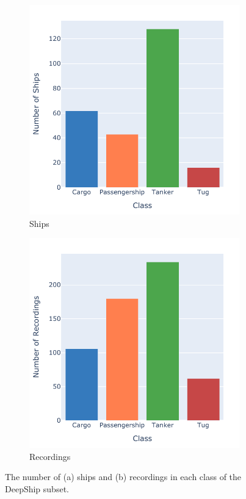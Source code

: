 \begin{figure}[p]
    \begin{subfigure}{0.49\textwidth}
        \centering
        \includegraphics[width=\textwidth]{img/ch3/deepship_figs/num_ships_per_class.pdf}
        \caption{Ships}
        \label{fig:deepship-subset-number-vessels}
    \end{subfigure}
    \hfill
    \begin{subfigure}{0.49\textwidth}
        \centering
        \includegraphics[width=\textwidth]{img/ch3/deepship_figs/num_recordings.pdf}
        \caption{Recordings}
        \label{fig:deepship-subset-number-recordings}
    \end{subfigure}
    \caption{The number of (a) ships and (b) recordings in each class of the DeepShip subset.}
    \label{fig:deepship-subset-vessels-recordings}
\end{figure}


